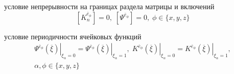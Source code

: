 условие непрерывности на границах раздела матрицы и включений
\begin{equation}
    \left[  K^{ \overline{e}_{\phi}}_n \right] = 0, \; \left[  \Psi^{ \overline{e}_{\phi}}\right] = 0
    , \; \phi \in \{x,y,z\}
\end{equation}

условие периодичности ячейковых функций
\begin{equation}
    \begin{gathered}
    \left. \Psi^{ \overline{e}_{\phi}} \left( \overline{\xi} \right) \right|_{\xi_{\alpha}=0} =
    \left. \Psi^{ \overline{e}_{\phi}} \left( \overline{\xi} \right) \right|_{\xi_{\alpha}=1}, \;
    \left. K^{ \overline{e}_{\phi}} \left( \overline{\xi} \right) \right|_{\xi_{\alpha}=0} =
    \left. K^{ \overline{e}_{\phi}} \left( \overline{\xi} \right) \right|_{\xi_{\alpha}=1},
    \\
    \alpha,\phi \in \{x,y,z\}
    \end{gathered}
\end{equation}


